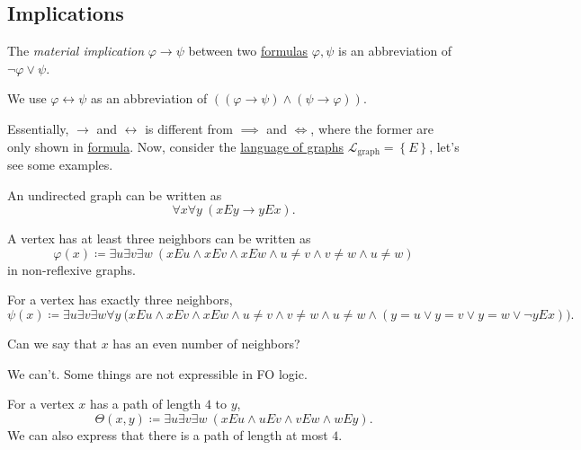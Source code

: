 \subsection{Implications}
\begin{notation}
	The \emph{material implication} \(\varphi \to \psi \) between two \hyperref[def:formula]{formulas} \(\varphi, \psi \) is an abbreviation of \(\lnot \varphi \lor \psi\).
\end{notation}

\begin{notation}
	We use \(\varphi \leftrightarrow \psi \) as an abbreviation of \(((\varphi \to \psi ) \land (\psi \to \varphi ))\).
\end{notation}

Essentially, \(\to \) and \(\leftrightarrow\) is different from \(\implies \) and \(\iff \), where the former are only shown in \hyperref[def:formula]{formula}. Now, consider the \hyperref[eg:language-graph]{language of graphs} \(\mathcal{L} _{\text{graph} } = \left\{ E\right\} \), let's see some examples.
\begin{eg}
	An undirected graph can be written as
	\[
		\forall x\forall y\ (xEy \to yEx).
	\]
\end{eg}

\begin{eg}
	A vertex has at least three neighbors can be written as
	\[
		\varphi (x) \coloneqq \exists u\exists v\exists w\ (xEu \land xEv \land xEw \land u \neq v\land v \neq w\land u \neq w)
	\]
	in non-reflexive graphs.
\end{eg}

\begin{eg}
	For a vertex has exactly three neighbors,
	\[
		\psi (x)\coloneqq \exists u \exists v \exists w \forall y\ \big(xEu \land xEv \land xEw \land u \neq v\land v \neq w\land u \neq w \land (y = u \lor y = v \lor y = w \lor \lnot y E x)\big).
	\]
\end{eg}

\begin{problem*}
	Can we say that \(x\) has an even number of neighbors?
\end{problem*}
\begin{answer}
	We can't. Some things are not expressible in FO logic.
\end{answer}

\begin{eg}
	For a vertex \(x\) has a path of length \(4\) to \(y\),
	\[
		\Theta (x, y) \coloneqq \exists u \exists v \exists w\ (xEu \land uEv \land vEw \land wEy).
	\]
	We can also express that there is a path of length at most \(4\).
\end{eg}

